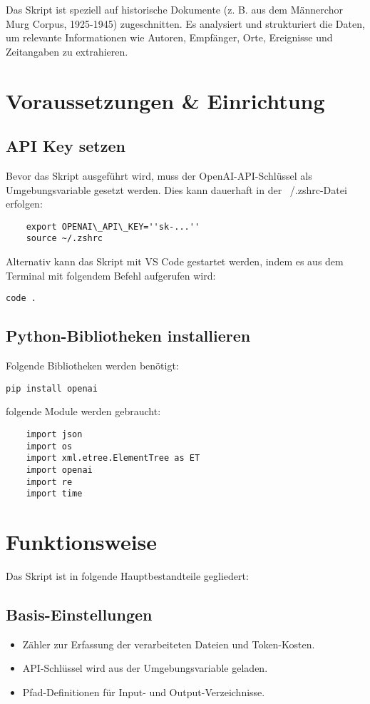 \documentclass{article}
\begin{document}
Das Skript ist speziell auf historische Dokumente (z. B. aus dem Männerchor Murg Corpus, 1925-1945) zugeschnitten. Es analysiert und strukturiert die Daten, um relevante Informationen wie Autoren, Empfänger, Orte, Ereignisse und Zeitangaben zu extrahieren.

\section{Voraussetzungen \& Einrichtung}

\subsection{API Key setzen}
Bevor das Skript ausgeführt wird, muss der OpenAI-API-Schlüssel als Umgebungsvariable gesetzt werden. Dies kann dauerhaft in der ~/.zshrc-Datei erfolgen:

\begin{verbatim}
    export OPENAI\_API\_KEY=''sk-...''
    source ~/.zshrc
\end{verbatim}    

Alternativ kann das Skript mit VS Code gestartet werden, indem es aus dem Terminal mit folgendem Befehl aufgerufen wird:

\begin{verbatim}
code .
\end{verbatim}

\subsection{Python-Bibliotheken installieren}
Folgende Bibliotheken werden benötigt:

\begin{verbatim}
pip install openai
\end{verbatim}

folgende Module werden gebraucht:

\begin{verbatim}
    import json
    import os
    import xml.etree.ElementTree as ET
    import openai
    import re
    import time
\end{verbatim}

\section{Funktionsweise}

Das Skript ist in folgende Hauptbestandteile gegliedert:

\subsection{Basis-Einstellungen}
\begin{itemize}
\item Zähler zur Erfassung der verarbeiteten Dateien und Token-Kosten.
\item API-Schlüssel wird aus der Umgebungsvariable geladen.
\item Pfad-Definitionen für Input- und Output-Verzeichnisse.
\end{itemize}
\end{document}

